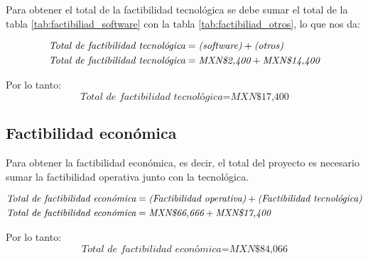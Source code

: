 Para obtener el total de la factibilidad tecnológica se debe sumar el total de la tabla \ref{tab:factibiliad_software} con la tabla \ref{tab:factibiliad_otros}, lo que nos da:

\begin{align}
	\textit{Total de factibilidad tecnológica} &= \textit{(software)} + \textit{(otros)} \notag \\
	\textit{Total de factibilidad tecnológica} &= \textit{MXN\$2,400} + \textit{MXN\$14,400} \notag
\end{align}

Por lo tanto:
\begin{equation}
	\textit{Total de factibilidad tecnológica} = \textit{MXN\$17,400}
\end{equation}
\subsection{Factibilidad económica}

Para obtener la factibilidad económica, es decir, el total del proyecto es necesario sumar la factibilidad operativa junto con la tecnológica.

\begin{align}
	\textit{Total de factibilidad económica} &= \textit{(Factibilidad operativa)} + \textit{(Factibilidad tecnológica)} \notag \\
	\textit{Total de factibilidad económica} &= \textit{MXN\$66,666} + \textit{MXN\$17,400} \notag
\end{align}

Por lo tanto:
\begin{equation}
	\textit{Total de factibilidad económica} = \textit{MXN\$84,066}
\end{equation}

